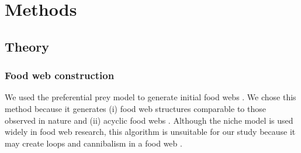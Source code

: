 \documentclass[11pt, class=article, crop=false]{standalone}
\begin{document}


\section{Methods}

\subsection{Theory}

\subsubsection{Food web construction}

We used the preferential prey model to generate initial food webs \citep{johnson_trophic_2014}.
We chose this method because it generates (i) food web structures comparable to those observed in nature and (ii) acyclic food webs \citep{shibasaki_food_2024}.
Although the niche model \citep{williams_simple_2000} is used widely in food web research, this algorithm is unsuitable for our study because it may create loops and cannibalism in a food web \citep{shibasaki_food_2024}.
\end{document}
